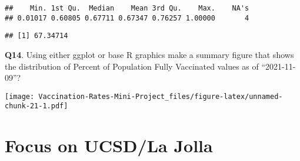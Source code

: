 \documentclass[
]{article}
\newenvironment{Shaded}{\begin{snugshade}}{\end{snugshade}}
\newcommand{\DecValTok}[1]{\textcolor[rgb]{0.00,0.00,0.81}{#1}}
\newcommand{\FunctionTok}[1]{\textcolor[rgb]{0.00,0.00,0.00}{#1}}
\newcommand{\NormalTok}[1]{#1}
\newcommand{\OtherTok}[1]{\textcolor[rgb]{0.56,0.35,0.01}{#1}}
\newcommand{\SpecialCharTok}[1]{\textcolor[rgb]{0.00,0.00,0.00}{#1}}
\begin{document}
\begin{Shaded}
\end{Shaded}

\begin{verbatim}
##    Min. 1st Qu.  Median    Mean 3rd Qu.    Max.    NA's 
## 0.01017 0.60805 0.67711 0.67347 0.76257 1.00000       4
\end{verbatim}

\begin{Shaded}
\end{Shaded}

\begin{verbatim}
## [1] 67.34714
\end{verbatim}

\textbf{Q14}. Using either ggplot or base R graphics make a summary
figure that shows the distribution of Percent of Population Fully
Vaccinated values as of ``2021-11-09''?

\begin{Shaded}
\end{Shaded}

\texttt{[image: Vaccination-Rates-Mini-Project\_files/figure-latex/unnamed-chunk-21-1.pdf]}

\hypertarget{focus-on-ucsdla-jolla}{%
\section{Focus on UCSD/La Jolla}\label{focus-on-ucsdla-jolla}}
\end{document}

